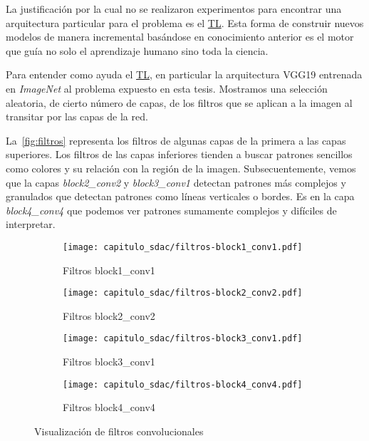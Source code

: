 La justificación por la cual no se realizaron experimentos para encontrar una
arquitectura particular para el problema es el \hyperlink{abbr}{TL}. Esta forma
de construir nuevos modelos de manera incremental basándose en conocimiento
anterior es el motor que guía no solo el aprendizaje humano sino toda la
ciencia.

Para entender como ayuda el \hyperlink{abbr}{TL}, en particular la arquitectura
VGG19 entrenada en \emph{ImageNet} al problema expuesto en esta tesis. Mostramos
una selección aleatoria, de cierto número de capas, de los filtros que se
aplican a la imagen al transitar por las capas de la red. 

La~\autoref{fig:filtros} representa los filtros de algunas capas de la primera a
las capas superiores. Los filtros de las capas inferiores tienden a buscar
patrones sencillos como colores y su relación con la región de la imagen.
Subsecuentemente, vemos que la capas \emph{block2\_conv2} y \emph{block3\_conv1}
detectan patrones más complejos y granulados que detectan patrones como líneas
verticales o bordes. Es en la capa \emph{block4\_conv4} que podemos ver patrones
sumamente complejos y difíciles de interpretar.

\begin{figure}[] 
  \begin{subfigure}[b]{0.5\linewidth}
    \centering
    \texttt{[image: capitulo\_sdac/filtros-block1\_conv1.pdf]} 
    \caption{Filtros block1\_conv1}\label{fig7:aa}
    \vspace{4ex}
  \end{subfigure}%
  \begin{subfigure}[b]{0.5\linewidth}
    \centering
    \texttt{[image: capitulo\_sdac/filtros-block2\_conv2.pdf]} 
    \caption{Filtros block2\_conv2}\label{fig7:bb}
    \vspace{4ex}
  \end{subfigure} 
  \begin{subfigure}[b]{0.5\linewidth}
    \centering
    \texttt{[image: capitulo\_sdac/filtros-block3\_conv1.pdf]} 
    \caption{Filtros block3\_conv1}\label{fig7:cc}
  \end{subfigure}%
  \begin{subfigure}[b]{0.5\linewidth}
    \centering
    \texttt{[image: capitulo\_sdac/filtros-block4\_conv4.pdf]} 
    \caption{Filtros block4\_conv4}\label{fig7:dd}
  \end{subfigure} 
  \caption{Visualización de filtros convolucionales}\label{fig:filtros} 
\end{figure}


